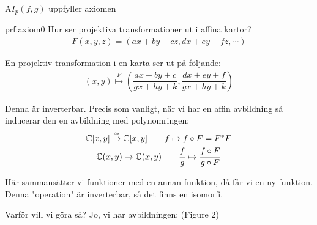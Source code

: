\par\bigskip
\begin{theo}
  A$I_p(f,g)$ uppfyller axiomen
\end{theo}
\par\bigskip
\begin{prf}[Axiom 0]{prf:axiom0}
  Hur ser projektiva transformationer ut i affina kartor?
  \begin{equation*}
    \begin{gathered}
      F(x,y,z) = (ax+by+cz,dx+ey+fz,\cdots)
    \end{gathered}
  \end{equation*}\par
  \noindent En projektiv transformation i en karta ser ut på följande:
  \begin{equation*}
    \begin{gathered}
      (x,y)\stackrel{F}{\mapsto} \left(\dfrac{ax+by+c}{gx+hy+k},\dfrac{dx+ey+f}{gx+hy+k}\right)
    \end{gathered}
  \end{equation*}\par
  \noindent Denna är inverterbar. Precis som vanligt, när vi har en affin avbildning så inducerar den en avbildning med polynomringen:
  \begin{equation*}
    \begin{gathered}
      \mathbb{C}[x,y]\stackrel{\cong}{\to}\mathbb{C}[x,y]\qquad f\mapsto f\circ F  =F^*F\\
      \mathbb{C}(x,y)\to\mathbb{C}(x,y)\qquad \dfrac{f}{g}\mapsto \dfrac{f\circ F}{g\circ F}
    \end{gathered}
  \end{equation*}\par
  \noindent Här sammansätter vi funktioner med en annan funktion, då får vi en ny funktion. Denna "operation" är inverterbar, så det finns en isomorfi.
  \par\bigskip
  \noindent Varför vill vi göra så? Jo, vi har avbildningen: (Figure 2)
\end{prf}
  \begin{figure}[ht!]
      \centering
      \caption{}
  \end{figure}
